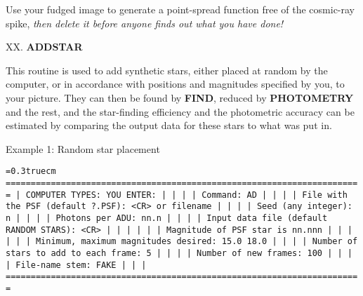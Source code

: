 Use your fudged image to generate a point-spread function free of the
cosmic-ray spike, {\it then delete it before anyone finds out what you
have done!}

\vfill
\eject
\noindent XX.  {\bf ADDSTAR}

This routine is used to add synthetic stars, either placed at
random by the computer, or in accordance with positions and magnitudes
specified by you, to your picture. They can then be found by {\bf
FIND}, reduced by {\bf PHOTOMETRY} and the rest, and the star-finding
efficiency and the photometric accuracy can be estimated by comparing
the output data for these stars to what was put in.

\bigskip

\noindent Example 1:  Random star placement

\bigskip
{\noindent\obeylines\obeyspaces\frenchspacing\tt\baselineskip=0.3truecm
=======================================================================
| COMPUTER TYPES:                                  YOU ENTER:         |
|                                                                     |
| Command:                                         AD                 |
|                                                                     |
|         File with the PSF (default ?.PSF):       <CR> or filename   |
|                                                                     |
|                        Seed (any integer):       n                  |
|                                                                     |
|                           Photons per ADU:       nn.n               |
|                                                                     |
|    Input data file (default RANDOM STARS):       <CR>               |
|                                                                     |
|                                                                     |
|               Magnitude of PSF star is nn.nnn                       |
|                                                                     |
|                                                                     |
|       Minimum, maximum magnitudes desired:       15.0 18.0          |
|                                                                     |
|      Number of stars to add to each frame:       5                  |
|                                                                     |
|                      Number of new frames:       100                |
|                                                                     |
|                            File-name stem:       FAKE               |
|                                                                     |
=======================================================================
}
\bigskip

